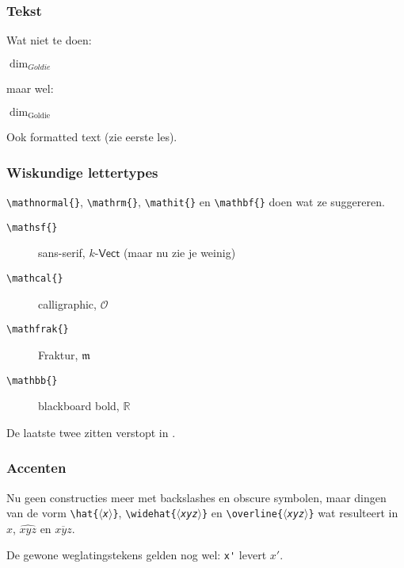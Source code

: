 \begin{frame}[fragile]
  \frametitle{Tekst}

  Wat niet te doen:
  \begin{LTXexample}
$\dim_{Goldie}$
  \end{LTXexample}
  maar wel:
  \begin{LTXexample}
$\dim_{\text{Goldie}}$
  \end{LTXexample}

  Ook formatted text (zie eerste les).
\end{frame}

\begin{frame}
  \frametitle{Wiskundige lettertypes}

  \texttt{\textcolor{uagreen}{\textbackslash mathnormal}\{\}}, \texttt{\textcolor{uagreen}{\textbackslash mathrm}\{\}}, \texttt{\textcolor{uagreen}{\textbackslash mathit}\{\}} en \texttt{\textcolor{uagreen}{\textbackslash mathbf}\{\}} doen wat ze suggereren.

  \begin{description}
    \item[\texttt{\textcolor{uagreen}{\textbackslash mathsf}\{\}}] sans-serif, $\text{$k$-}\mathsf{Vect}$ (maar nu zie je weinig)
    \item[\texttt{\textcolor{uagreen}{\textbackslash mathcal}\{\}}] calligraphic, $\mathcal{O}$
    \item[\texttt{\textcolor{uagreen}{\textbackslash mathfrak}\{\}}] Fraktur, $\mathfrak{m}$
    \item[\texttt{\textcolor{uagreen}{\textbackslash mathbb}\{\}}] blackboard bold, $\mathbb{R}$
  \end{description}

  De laatste twee zitten verstopt in .
\end{frame}

\begin{frame}[fragile]
  \frametitle{Accenten}

  Nu geen constructies meer met backslashes en obscure symbolen, maar dingen van de vorm \texttt{\textcolor{uagreen}{\textbackslash hat}\{\textsl{$\langle$x$\rangle$}\}}, \texttt{\textcolor{uagreen}{\textbackslash widehat}\{\textsl{$\langle$xyz$\rangle$}\}} en \texttt{\textcolor{uagreen}{\textbackslash overline}\{\textsl{$\langle$xyz$\rangle$}\}} wat resulteert in $\hat{x}$, $\widehat{xyz}$ en $\overline{xyz}$.

  De gewone weglatingstekens gelden nog wel: \verb|x'| levert $x'$.
\end{frame}


